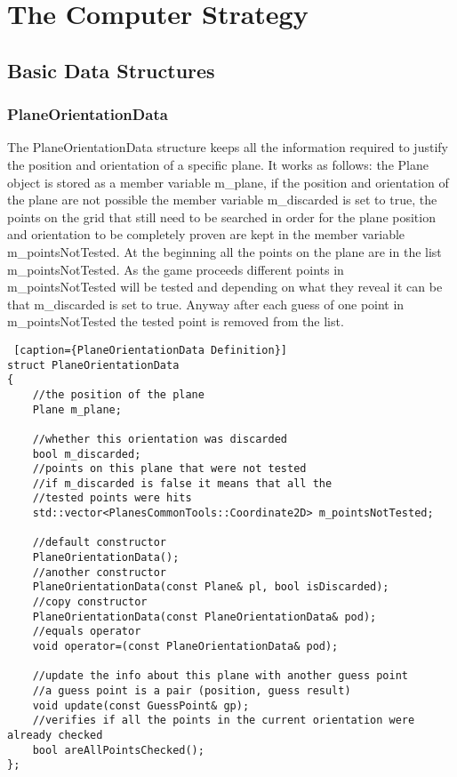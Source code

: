 \section{The Computer Strategy} \label {Computer_Strategy}

\subsection{Basic Data Structures} \label {Strategy_Data_Structures}

\subsubsection{PlaneOrientationData}

The PlaneOrientationData structure keeps all the information required to justify the position and orientation of a specific plane. It works as follows: the Plane object is stored as a member variable m\_plane, if the position and orientation of the plane are not possible the member variable m\_discarded is set to true, the points on the grid that still need to be searched in order for the plane position and orientation to be completely proven are kept in the member variable m\_pointsNotTested. At the beginning all the points on the plane are in the list m\_pointsNotTested. As the game proceeds different points in m\_pointsNotTested will be tested and depending on what they reveal it can be that m\_discarded is set to true. Anyway after each guess of one point in m\_pointsNotTested the tested point is removed from the list. 

\begin{lstlisting} [caption={PlaneOrientationData Definition}]
struct PlaneOrientationData
{
	//the position of the plane
	Plane m_plane;
	
	//whether this orientation was discarded
	bool m_discarded;
	//points on this plane that were not tested
	//if m_discarded is false it means that all the
	//tested points were hits
	std::vector<PlanesCommonTools::Coordinate2D> m_pointsNotTested;
	
	//default constructor
	PlaneOrientationData();
	//another constructor
	PlaneOrientationData(const Plane& pl, bool isDiscarded);
	//copy constructor
	PlaneOrientationData(const PlaneOrientationData& pod);
	//equals operator
	void operator=(const PlaneOrientationData& pod);
	
	//update the info about this plane with another guess point
	//a guess point is a pair (position, guess result)
	void update(const GuessPoint& gp);
	//verifies if all the points in the current orientation were already checked
	bool areAllPointsChecked();
};

\end{lstlisting}

